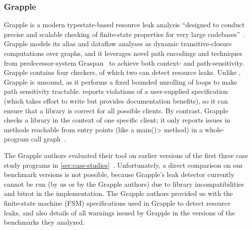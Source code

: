 

\subsubsection{Grapple}
\label{sec:grapple}

Grapple is a modern typestate-based resource leak analysis
``designed to conduct precise and scalable checking of finite-state properties for very
large codebases''~\cite{zuo2019grapple}. Grapple models its alias and
dataflow analyses as dynamic transitive-closure computations over graphs, and
it leverages novel path encodings and techniques from predecessor-system
Graspan~\cite{wang2017graspan} to achieve both context- and path-sensitivity.  
Grapple contains four checkers, of which two can detect
resource leaks.  Unlike \tool, Grapple is unsound, as it performs a fixed bounded unrolling
of loops to make path sensitivity tractable.
\Tool reports violations of a user-supplied specification
(which takes effort to write but provides documentation benefits), so it
can ensure that a library is correct for all possible clients.  By
contrast, Grapple checks a library in the context of one specific client; it
only reports issues in methods reachable from entry points (like a \<main()>
method) in a whole-program call graph~\cite{grapplepersonal}.

The Grapple authors evaluated their tool on earlier versions of the first three
case study programs in \cref{sec:case-studies}~\cite{zuo2019grapple}.
Unfortunately, a direct comparison on our benchmark versions is not possible, because
Grapple's leak detector currently cannot be run
(by us or by the Grapple authors) due to library incompatibilities and bitrot in
the implementation. The Grapple authors provided us with the finite-state
machine (FSM) specifications used in Grapple to detect resource leaks, and also
details of all warnings issued by Grapple in the versions of the benchmarks they
analyzed.

